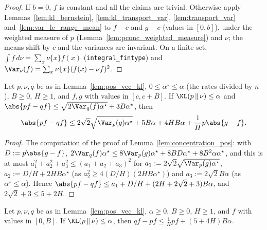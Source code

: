\begin{proof}
\leanok
If $b = 0$, $f$ is constant and all the claims are trivial. Otherwise apply
Lemmas~\ref{lem:kl_bernstein}, \ref{lem:kl_transport_var}, \ref{lem:transport_var}
and~\ref{lem:var_le_range_mean} to $f - c$ and $g - c$ (values in $[0, b]$), under the weighted
measure of $p$ (Lemma~\ref{lem:pconc_weighted_measure}) and $\nu$; the means shift by $c$ and the
variances are invariant. On a finite set, $\int f\,d\nu = \sum_x\nu\{x\}f(x)$
(\texttt{integral\_fintype}) and $\Var_\nu(f) = \sum_x \nu\{x\}(f(x) - \nu f)^2$.
\end{proof}

\begin{lemma}\label{lem:pos_core_concentration}
\leanok
{}
Let $p, \nu, q$ be as in Lemma~\ref{lem:pos_vec_kl}, $0 \le \alpha^\star \le \alpha$ (the rates divided by
$n$), $B \ge 0$, $H \ge 1$, and $f, g$ with values in $[c, c + B]$. If $\KL(p \,\|\, \nu) \le \alpha$ and
$\abs{pf - qf} \le \sqrt{2\Var_q(f)\alpha^\star} + 3B\alpha^\star$, then
\[
  \abs{pf - qf} \le 2\sqrt2\sqrt{\Var_p(g)\alpha^\star} + 5B\alpha + 4HB\alpha + \frac1H p\abs{g - f} .
\]
\end{lemma}

\begin{proof}
\leanok
The computation of the proof of Lemma~\ref{lem:concentration_pos}: with $D := p\abs{g - f}$,
$2\Var_q(f)\alpha^\star \le 8\Var_p(g)\alpha^\star + 8BD\alpha^\star + 8B^2\alpha\alpha^\star$, and this is at most
$a_1^2 + a_2^2 + a_3^2 \le (a_1 + a_2 + a_3)^2$ for $a_1 := 2\sqrt2\sqrt{\Var_p(g)\alpha^\star}$,
$a_2 := D/H + 2HB\alpha^\star$ (as $a_2^2 \ge 4(D/H)(2HB\alpha^\star)$) and $a_3 := 2\sqrt2 B\alpha$ (as
$\alpha^\star \le \alpha$). Hence $\abs{pf - qf} \le a_1 + D/H + (2H + 2\sqrt2 + 3)B\alpha$, and
$2\sqrt2 + 3 \le 5 + 2H$.
\end{proof}

\begin{lemma}\label{lem:pos_core_third_term}
\leanok
{}
Let $p, \nu, q$ be as in Lemma~\ref{lem:pos_vec_kl}, $\alpha \ge 0$, $B \ge 0$, $H \ge 1$, and $f$ with
values in $[0, B]$. If $\KL(p \,\|\, \nu) \le \alpha$, then $qf - pf \le \frac1H pf + (5 + 4H)B\alpha$.
\end{lemma}

